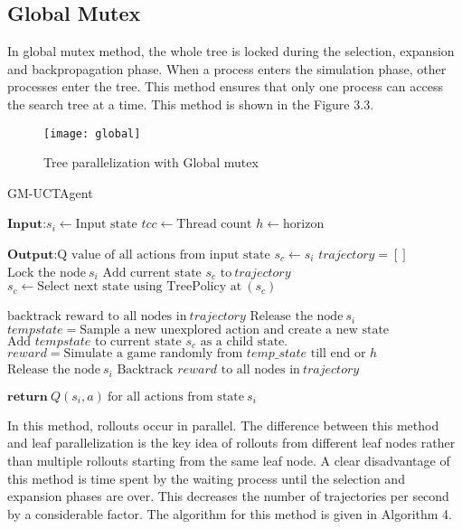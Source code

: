 \documentclass[double,12pt]{beavtex}
\begin{document}
\subsection{Global Mutex}
In global mutex method, the whole tree is locked during the selection, expansion and backpropagation phase. When a process enters the simulation phase, other processes enter the tree. This method ensures that only one process can access the search tree at a time. This method is shown in the Figure 3.3. 

\begin{figure}[h!]
\centering
\texttt{[image: global]}
\caption{Tree parallelization with Global mutex}
\end{figure}

\begin{algorithm}
	\caption{GM-UCTAgent}
	\label{alg:smartmeter}
	\begin{algorithmic}[1]
		\Statex $\textbf{Input:}   s_i \leftarrow \text{Input state}$
		\Statex $tcc\leftarrow \text{Thread count}$ 
		\Statex $h\leftarrow \text{horizon}$

		\Statex $\textbf{Output:}  \text{Q value of all actions from input state}$
			\State $s_c \leftarrow s_i$
			\State $trajectory = []$
			\State $\text{Lock the node}~s_i$
				\State $\text{Add current state $s_c$ to}~trajectory$
				\State $s_c \leftarrow \text{Select next state using TreePolicy at}~(s_c)$
			\EndWhile

				\State $\text{backtrack reward to all nodes in}~trajectory$
				\State $\text{Release the node}~s_i$
			\Else
				\State $tempstate = \text{Sample a new unexplored action and create a new state}$
				\State $\text{Add $tempstate$ to current state $s_c$ as a child state.}$
				\State $reward = \text{Simulate a game randomly from $temp\_state$ till end or $h$}$
				\State $\text{Release the node}~s_i$
				\State $\text{Backtrack $reward$ to all nodes in}~trajectory$
			\EndIf
		\EndFor

		\Statex $\textbf{return}~Q(s_i,a)~\text{for all actions from state}~s_i$
	\end{algorithmic}
\end{algorithm}



In this method, rollouts occur in parallel. The difference between this method and leaf parallelization is the key idea of rollouts from different leaf nodes rather than multiple rollouts starting from the same leaf node. A clear disadvantage of this method is time spent by the waiting process until the selection and expansion phases are over. This decreases the number of trajectories per second by a considerable factor. The algorithm for this method is given in Algorithm 4.
\end{document}
